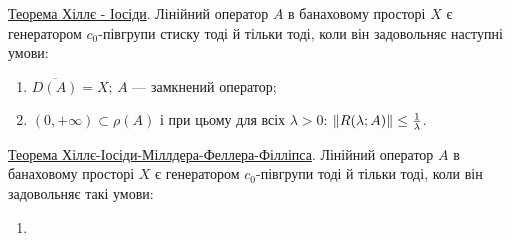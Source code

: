 \begin{theory}
    \ul{Теорема Хіллє - Іосіди}. Лінійний оператор $A$ в банаховому просторі $X$ є 
    генератором $c_0$-півгрупи стиску тоді й тільки тоді, коли він задовольняє 
    наступні умови:
    \begin{enumerate}
        \item $\overline{D(A)} = X$; $A$ --- замкнений оператор;
        \item $(0, +\infty) \subset \rho(A)$ і при цьому для всіх $\lambda > 0$: 
        $\left\lVert R(\lambda; A)\right\rVert \leq \frac{1}{\lambda}$.
    \end{enumerate}
    \ul{Теорема Хіллє-Іосіди-Міллдера-Феллера-Філліпса}. Лінійний оператор $A$ в банаховому 
    просторі $X$ є генератором $c_0$-півгрупи тоді й тільки тоді, коли він задовольняє 
    такі умови:
    \begin{enumerate}
        \item 
    \end{enumerate}
\end{theory}